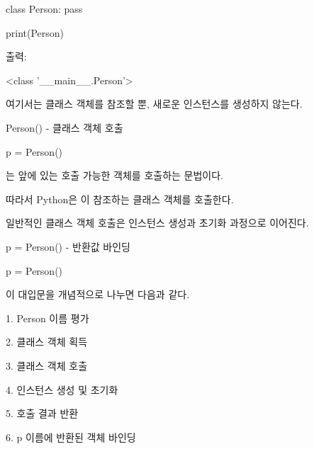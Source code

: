 \begin{dhkcode}
class Person:
    pass

print(Person)
\end{dhkcode}

출력:

\begin{dhkzsh}
<class '__main__.Person'>
\end{dhkzsh}

여기서는 클래스 객체를 참조할 뿐, 새로운 인스턴스를 생성하지 않는다.

\begin{dhknote}
\begin{dhksmry}[centered]
Person() - 클래스 객체 호출
\end{dhksmry}
\end{dhknote}

\begin{dhkcode}
p = Person()
\end{dhkcode}

\zsh{()}는 앞에 있는 호출 가능한 객체를 호출하는 문법이다.

따라서 Python은 이 참조하는 클래스 객체를 호출한다.

일반적인 클래스 객체 호출은 인스턴스 생성과 초기화 과정으로 이어진다.

\begin{dhknote}
\begin{dhksmry}[centered]
p = Person() - 반환값 바인딩
\end{dhksmry}
\end{dhknote}

\begin{dhkcode}
p = Person()
\end{dhkcode}

이 대입문을 개념적으로 나누면 다음과 같다.

\begin{dhksmry}[centered]
1. Person 이름 평가

\da

2. 클래스 객체 획득

\da

3. 클래스 객체 호출

\da

4. 인스턴스 생성 및 초기화

\da

5. 호출 결과 반환

\da

6. p 이름에 반환된 객체 바인딩
\end{dhksmry}


